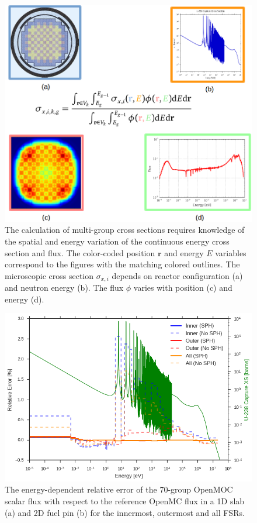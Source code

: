 \documentclass[12pt,twoside]{mitthesis-exec}
\begin{document}
\begin{figure}[h!]
\centering
\includegraphics[width=0.9\linewidth]{figures/mgxs/mgxs-overlay}
\caption[Energy and spatial variation in MGXS]{The calculation of multi-group cross sections requires knowledge of the spatial and energy variation of the continuous energy cross section and flux. The color-coded position $\mathbf{r}$ and energy $E$ variables correspond to the figures with the matching colored outlines. The microscopic cross section $\sigma_{x,i}$ depends on reactor configuration (a) and neutron energy (b). The flux $\phi$ varies with position (c) and energy (d).}
\label{fig:mgxs-overlay}
\end{figure}

\begin{figure}[h!]
\centering
\includegraphics[width=\linewidth]{figures/sph/pin-cell/rel-err-inner-outer}
\caption[Flux relative error by energy group with SPH]{The energy-dependent relative error of the 70-group OpenMOC scalar flux with respect to the reference OpenMC flux in a 1D slab (a) and 2D fuel pin (b) for the innermost, outermost and all FSRs.}
\label{fig:chap6-rel-err-energy}
\end{figure}
\end{document}
